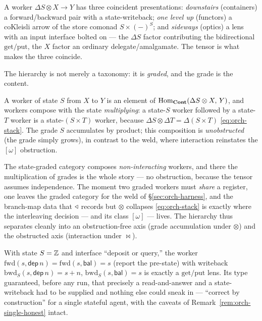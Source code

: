 \begin{proposition}\label{prop:orch-three-names}
A worker $\Delta S\otimes X\to Y$ has three coincident presentations: \emph{downstairs} (containers)
a forward/backward pair with a state-writeback; \emph{one level up} (functors) a coKleisli arrow of
the store comonad $S\times(-)^S$; and \emph{sideways} (optics) a lens with an input interface bolted
on --- the $\Delta S$ factor contributing the bidirectional $\mathrm{get}/\mathrm{put}$, the $X$
factor an ordinary delegate/amalgamate. The tensor is what makes the three coincide.
\end{proposition}

The hierarchy is not merely a taxonomy: it is \emph{graded}, and the grade is the content.

\begin{proposition}\label{prop:orch-graded}
A worker of state $S$ from $X$ to $Y$ is an element of $\mathrm{Hom}_{\mathbf{Cont}}(\Delta S\otimes X,\,Y)$, and
workers compose with the state \emph{multiplying}: a state-$S$ worker followed by a state-$T$ worker
is a state-$(S\times T)$ worker, because $\Delta S\otimes\Delta T=\Delta(S\times T)$
\eqref{eq:orch-stack}. The grade $S$ accumulates by product; this composition is
\emph{unobstructed} (the grade simply grows), in contrast to the weld, where interaction reinstates
the $[\omega]$ obstruction.
\end{proposition}

\begin{remark}\label{rem:orch-grading-honest}
The state-graded category composes \emph{non-interacting} workers, and there the multiplication of
grades is the whole story --- no obstruction, because the tensor assumes independence. The moment two
graded workers must \emph{share} a register, one leaves the graded category for the weld of
\S\ref{sec:orch-harness}, and the branch-map data that $\triangleleft$ records but $\otimes$ collapses
\eqref{eq:orch-stack} is exactly where the interleaving decision --- and its class $[\omega]$ ---
lives. The hierarchy thus separates cleanly into an obstruction-free axis (grade accumulation under
$\otimes$) and the obstructed axis (interaction under $\bowtie$).
\end{remark}

\begin{example}\label{ex:orch-balance}
With state $S=\mathbb{Z}$ and interface ``deposit or query,'' the worker
$\mathrm{fwd}(s,\mathsf{dep}\,n)=\mathrm{fwd}(s,\mathsf{bal})=s$ (report the pre-state) with writeback
$\mathrm{bwd}_S(s,\mathsf{dep}\,n)=s+n$, $\mathrm{bwd}_S(s,\mathsf{bal})=s$ is exactly a
$\mathrm{get}/\mathrm{put}$ lens. Its type guaranteed, before any run, that precisely a read-and-answer
and a state-writeback had to be supplied and nothing else could sneak in --- ``correct by construction''
for a single stateful agent, with the caveats of Remark~\ref{rem:orch-single-honest} intact.
\end{example}

